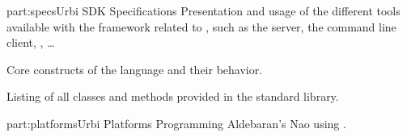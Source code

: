 \begin{partDescription}{part:specs}{Urbi SDK Specifications}
%
  Presentation and usage of the different tools available with the
  \urbi framework related to \us, such as the \urbi server, the
  command line client, \umake, \ldots

%
  Core constructs of the language and their behavior.

%
  Listing of all classes and methods provided in the standard library.

\end{partDescription}

\begin{partDescription}{part:platforms}{Urbi Platforms}
%
  Programming Aldebaran's Nao using \urbi.
\end{partDescription}




